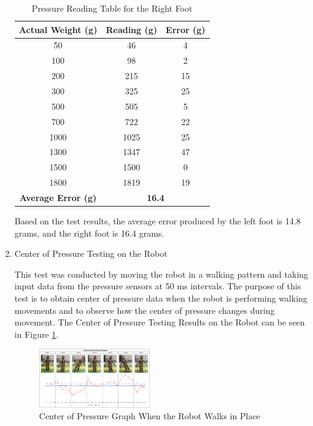 \begin{enumerate}[label=\Alph*.]
        \begin{table}[h!]
            \centering
            \caption{Pressure Reading Table for the Right Foot}
            \begin{tabular}{|c|c|c|}
                \hline
                \textbf{Actual Weight (g)} & \textbf{Reading (g)} & \textbf{Error (g)} \\
                \hline
                50    & 46    & 4    \\
                100   & 98    & 2    \\
                200   & 215   & 15   \\
                300   & 325   & 25   \\
                500   & 505   & 5    \\
                700   & 722   & 22   \\
                1000  & 1025  & 25   \\
                1300  & 1347  & 47   \\
                1500  & 1500  & 0    \\
                1800  & 1819  & 19   \\
                \hline
                \textbf{Average Error (g)} & \multicolumn{2}{c|}{\textbf{16.4}} \\
                \hline
            \end{tabular}
            \label{tab:right_foot_weight_measurement}
        \end{table}

        \hspace*{1em} Based on the test results, the average error produced by the left foot is 14.8 grams, and the right foot is 16.4 grams.

    \item Center of Pressure Testing on the Robot
    \label{subsec:results-discussion-cop}

        \hspace*{1em} This test was conducted by moving the robot in a walking pattern and taking input data from the pressure sensors at 50 ms intervals. The purpose of this test is to obtain center of pressure data when the robot is performing walking movements and to observe how the center of pressure changes during movement. The Center of Pressure Testing Results on the Robot can be seen in Figure \ref{fig:robot_cop}.

        \begin{figure}[h]
            \centering
            \includegraphics[width=0.45\textwidth]{gambar/motion_berjalan.png}
            \caption{Center of Pressure Graph When the Robot Walks in Place}
            \label{fig:robot_cop}
        \end{figure}


\end{enumerate}
